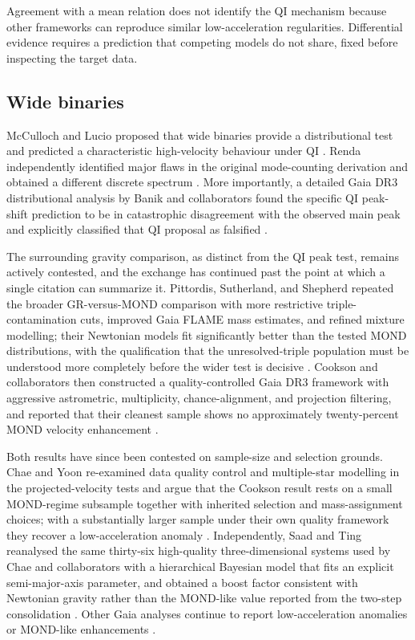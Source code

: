 \documentclass[11pt]{article}
\begin{document}
Agreement with a mean relation does not identify the QI mechanism because other frameworks can reproduce similar low-acceleration regularities. Differential evidence requires a prediction that competing models do not share, fixed before inspecting the target data.

\subsection{Wide binaries}

McCulloch and Lucio proposed that wide binaries provide a distributional test and predicted a characteristic high-velocity behaviour under QI \cite{McCullochLucio2019}. Renda independently identified major flaws in the original mode-counting derivation and obtained a different discrete spectrum \cite{Renda2019}. More importantly, a detailed Gaia DR3 distributional analysis by Banik and collaborators found the specific QI peak-shift prediction to be in catastrophic disagreement with the observed main peak and explicitly classified that QI proposal as falsified \cite{Banik2024}.

The surrounding gravity comparison, as distinct from the QI peak test, remains actively contested, and the exchange has continued past the point at which a single citation can summarize it. Pittordis, Sutherland, and Shepherd repeated the broader GR-versus-MOND comparison with more restrictive triple-contamination cuts, improved Gaia FLAME mass estimates, and refined mixture modelling; their Newtonian models fit significantly better than the tested MOND distributions, with the qualification that the unresolved-triple population must be understood more completely before the wider test is decisive \cite{Pittordis2025}. Cookson and collaborators then constructed a quality-controlled Gaia DR3 framework with aggressive astrometric, multiplicity, chance-alignment, and projection filtering, and reported that their cleanest sample shows no approximately twenty-percent MOND velocity enhancement \cite{Cookson2026}.

Both results have since been contested on sample-size and selection grounds. Chae and Yoon re-examined data quality control and multiple-star modelling in the projected-velocity tests and argue that the Cookson result rests on a small MOND-regime subsample together with inherited selection and mass-assignment choices; with a substantially larger sample under their own quality framework they recover a low-acceleration anomaly \cite{ChaeYoon2026}. Independently, Saad and Ting reanalysed the same thirty-six high-quality three-dimensional systems used by Chae and collaborators with a hierarchical Bayesian model that fits an explicit semi-major-axis parameter, and obtained a boost factor consistent with Newtonian gravity rather than the MOND-like value reported from the two-step consolidation \cite{SaadTing2026}. Other Gaia analyses continue to report low-acceleration anomalies or MOND-like enhancements \cite{Chae2023,ChaeEtAl2026}.
\end{document}
